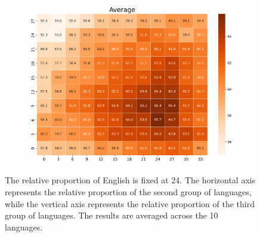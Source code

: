 \documentclass[11pt]{article}
\begin{document}
\begin{figure}[h]
\begin{subfigure}[b]{0.3\linewidth}
        \includegraphics[width=\linewidth]{picture/figure3_Average.png}
    \end{subfigure}
    
    \caption{The relative proportion of English is fixed at 24. The horizontal axis represents the relative proportion of the second group of languages, while the vertical axis represents the relative proportion of the third group of languages. The results are averaged across the 10 languages.}
\end{figure}
\end{document}
